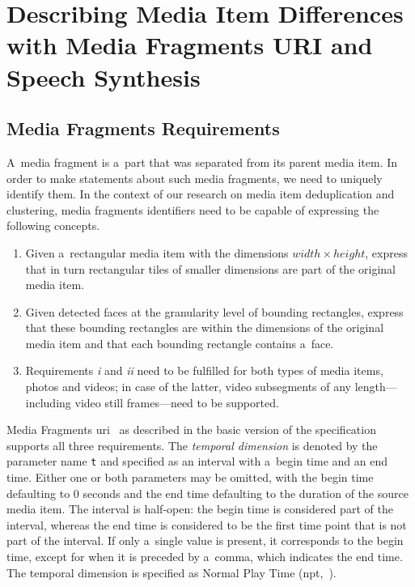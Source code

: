 \section{Describing Media Item Differences with Media Fragments URI and Speech Synthesis}

\subsection{Media Fragments Requirements}
\label{sec:media-fragment-requirements}

A~media fragment is a~part that was separated from its parent media item.
In order to make statements about such media fragments,
we need to uniquely identify them.
In the context of our research on media item deduplication and clustering,
media fragments identifiers need to be capable of expressing the following concepts.

\begin{enumerate}
  \itemsep0em
  \item Given a~rectangular media item with the dimensions
    $ width \times height $, express that in turn rectangular
    tiles of smaller dimensions are part of the original media item.
  \item Given detected faces at the granularity level of bounding rectangles,
    express that these bounding rectangles are within the dimensions
    of the original media item and that each bounding rectangle contains a~face.
  \item Requirements \textit{i} and \textit{ii} need to be fulfilled
    for both types of media items, photos and videos; in case of the latter,
    video subsegments of any length---including video still frames---need to be supported.
\end{enumerate}

Media Fragments {\sc uri}~\cite{troncy2012mediafragments}
as described in the basic version of the specification
supports all three requirements.
The \emph{temporal dimension} is denoted by the parameter name \texttt{t}
and specified as an interval with a~begin time and an end time.
Either one or both parameters may be omitted,
with the begin time defaulting to 0 seconds
and the end time defaulting to the duration of the source media item.
The interval is half-open: the begin time is considered part of the interval,
whereas the end time is considered to be the first time point
that is not part of the interval.
If only a~single value is present, it corresponds to the begin time,
except for when it is preceded by a~comma,
which indicates the end time.
The temporal dimension is specified as Normal Play Time
({\sc npt},~\cite{schulzrinne1998realtime}).

